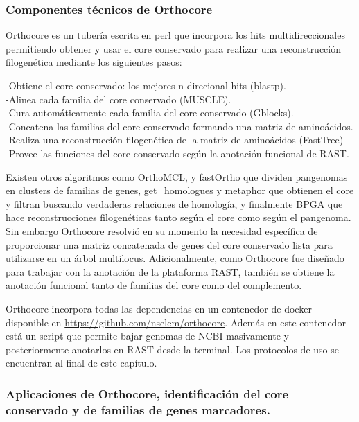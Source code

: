 \documentclass[]{article}
\begin{document}
\subsubsection{Componentes técnicos de
Orthocore}\label{componentes-tecnicos-de-orthocore}

Orthocore es un tubería escrita en perl que incorpora los hits
multidireccionales permitiendo obtener y usar el core conservado para
realizar una reconstrucción filogenética mediante los siguientes pasos:

-Obtiene el core conservado: los mejores n-direcional hits (blastp).\\
-Alinea cada familia del core conservado (MUSCLE).\\
-Cura automáticamente cada familia del core conservado (Gblocks).\\
-Concatena las familias del core conservado formando una matriz de
aminoácidos.\\
-Realiza una reconstrucción filogenética de la matriz de aminoácidos
(FastTree)\\
-Provee las funciones del core conservado según la anotación funcional
de RAST.

Existen otros algoritmos como OrthoMCL, y fastOrtho que dividen
pangenomas en clusters de familias de genes, get\_homologues y metaphor
que obtienen el core y filtran buscando verdaderas relaciones de
homología, y finalmente BPGA que hace reconstrucciones filogenéticas
tanto según el core como según el pangenoma. Sin embargo Orthocore
resolvió en su momento la necesidad específica de proporcionar una
matriz concatenada de genes del core conservado lista para utilizarse en
un árbol multilocus. Adicionalmente, como Orthocore fue diseñado para
trabajar con la anotación de la plataforma RAST, también se obtiene la
anotación funcional tanto de familias del core como del complemento.

Orthocore incorpora todas las dependencias en un contenedor de docker
disponible en \url{https://github.com/nselem/orthocore}. Además en este
contenedor está un script que permite bajar genomas de NCBI masivamente
y posteriormente anotarlos en RAST desde la terminal. Los protocolos de
uso se encuentran al final de este capítulo.

\subsubsection{Aplicaciones de Orthocore, identificación del core
conservado y de familias de genes
marcadores.}\label{aplicaciones-de-orthocore-identificacion-del-core-conservado-y-de-familias-de-genes-marcadores.}
\end{document}

